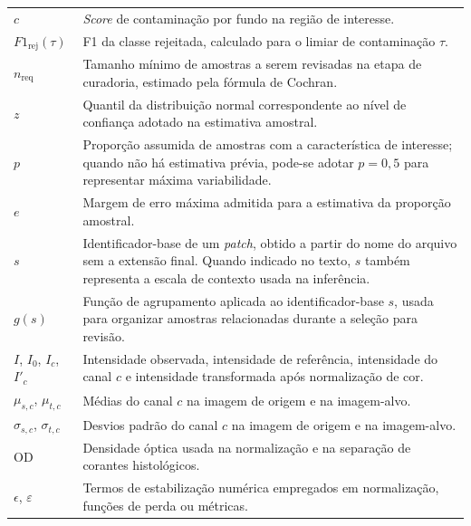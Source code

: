 \begin{longtable}{p{3.0cm}p{12.0cm}}
  $c$ &
  \textit{Score} de contaminação por fundo na região de interesse.\\

  $F1_{\mathrm{rej}}(\tau)$ &
  F1 da classe rejeitada, calculado para o limiar de contaminação $\tau$.\\

  $n_{\mathrm{req}}$ &
  Tamanho mínimo de amostras a serem revisadas na etapa de curadoria, estimado
  pela fórmula de Cochran.\\

  $z$ &
  Quantil da distribuição normal correspondente ao nível de confiança adotado na
  estimativa amostral.\\

  $p$ &
  Proporção assumida de amostras com a característica de interesse; quando não há
  estimativa prévia, pode-se adotar $p=0{,}5$ para representar máxima
  variabilidade.\\

  $e$ &
  Margem de erro máxima admitida para a estimativa da proporção amostral.\\

  $s$ &
  Identificador-base de um \textit{patch}, obtido a partir do nome do arquivo sem
  a extensão final. Quando indicado no texto, $s$ também representa a escala de
  contexto usada na inferência.\\

  $g(s)$ &
  Função de agrupamento aplicada ao identificador-base $s$, usada para organizar
  amostras relacionadas durante a seleção para revisão.\\

  $I$, $I_0$, $I_c$, $I'_c$ &
  Intensidade observada, intensidade de referência, intensidade do canal $c$ e
  intensidade transformada após normalização de cor.\\

  $\mu_{s,c}$, $\mu_{t,c}$ &
  Médias do canal $c$ na imagem de origem e na imagem-alvo.\\

  $\sigma_{s,c}$, $\sigma_{t,c}$ &
  Desvios padrão do canal $c$ na imagem de origem e na imagem-alvo.\\

  $\mathrm{OD}$ &
  Densidade óptica usada na normalização e na separação de corantes
  histológicos.\\

  $\epsilon$, $\varepsilon$ &
  Termos de estabilização numérica empregados em normalização, funções de perda
  ou métricas.\\


\end{longtable}
